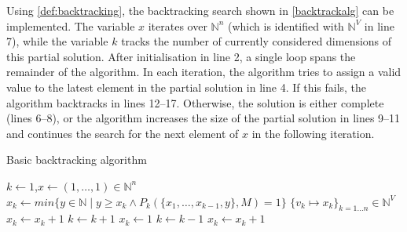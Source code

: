     Using \autoref{def:backtracking}, the backtracking search shown in
    \autoref{backtrackalg} can be implemented.
    The variable $x$ iterates over $\mathbb N^n$
    (which is identified with $\mathbb N^V$ in line 7), while the variable $k$
    tracks the number of currently considered dimensions of this partial
    solution.
    After initialisation in line 2, a single loop spans the remainder of the
    algorithm.
    In each iteration, the algorithm tries to assign a valid value to the latest
    element in the partial solution in line 4.
    If this fails, the algorithm backtracks in lines 12--17.
    Otherwise, the solution is either complete (lines 6--8), or the algorithm
    increases the size of the partial solution in lines 9--11 and continues the
    search for the next element of $x$ in the following iteration.

\begin{algorithm}[H]
    \caption{Basic backtracking algorithm}
    \begin{algorithmic}[1]
        \vspace{-0.45em}
            \State $k\gets1$,\quad$x\gets(1,\dots,1)\in\mathbb N^n$\vspace{-0.45em}
            \vspace{-0.45em}
                \State $x_k\gets min\{y\in\mathbb N\mid y\geq x_k\mathrel\land P_k(\{x_1,\dots,x_{k-1},y\},M)=1\}$\vspace{-0.45em}
                \vspace{-0.45em}
                    \vspace{-0.45em}
                         $\{v_k\mapsto x_k\}_{k=1\dots n}\in\mathbb N^V$\vspace{-0.45em}
                        \State $x_k\gets x_k+1$\vspace{-0.45em}
                    \Else\vspace{-0.45em}
                        \State $k\gets k+1$\vspace{-0.45em}
                        \State $x_k\gets1$\vspace{-0.45em}
                    \EndIf
                \Else\vspace{-0.45em}
                    \State $k\gets k-1$\vspace{-0.45em}
                    \vspace{-0.45em}
                        \State$x_k\gets x_k+1$\vspace{-0.45em}
                    \Else\vspace{-0.45em}
                    \EndIf
                \EndIf
            \EndWhile
        \EndProcedure
    \end{algorithmic}
    \label{backtrackalg}
\end{algorithm}

